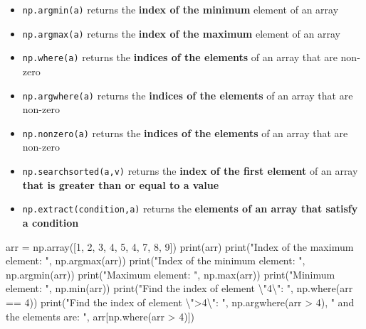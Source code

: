 \documentclass[
  letterpaper,
  DIV=11,
  numbers=noendperiod]{scrreprt}
\newenvironment{Shaded}{\begin{snugshade}}{\end{snugshade}}
\newcommand{\BuiltInTok}[1]{\textcolor[rgb]{0.00,0.23,0.31}{#1}}
\newcommand{\CharTok}[1]{\textcolor[rgb]{0.13,0.47,0.30}{#1}}
\newcommand{\DecValTok}[1]{\textcolor[rgb]{0.68,0.00,0.00}{#1}}
\newcommand{\NormalTok}[1]{\textcolor[rgb]{0.00,0.23,0.31}{#1}}
\newcommand{\OperatorTok}[1]{\textcolor[rgb]{0.37,0.37,0.37}{#1}}
\newcommand{\StringTok}[1]{\textcolor[rgb]{0.13,0.47,0.30}{#1}}
\providecommand{\tightlist}{%
  \setlength{\itemsep}{0pt}\setlength{\parskip}{0pt}}\usepackage{longtable,booktabs,array}
\begin{document}
\begin{itemize}
\tightlist
\item
  \texttt{np.argmin(a)} returns the \textbf{index of the minimum}
  element of an array
\item
  \texttt{np.argmax(a)} returns the \textbf{index of the maximum}
  element of an array
\item
  \texttt{np.where(a)} returns the \textbf{indices of the elements} of
  an array that are non-zero
\item
  \texttt{np.argwhere(a)} returns the \textbf{indices of the elements}
  of an array that are non-zero
\item
  \texttt{np.nonzero(a)} returns the \textbf{indices of the elements} of
  an array that are non-zero
\item
  \texttt{np.searchsorted(a,v)} returns the \textbf{index of the first
  element} of an array \textbf{that is greater than or equal to a value}
\item
  \texttt{np.extract(condition,a)} returns the \textbf{elements of an
  array that satisfy a condition}
\end{itemize}

\begin{Shaded}
\begin{Highlighting}[]
\NormalTok{arr }\OperatorTok{=}\NormalTok{ np.array([}\DecValTok{1}\NormalTok{, }\DecValTok{2}\NormalTok{, }\DecValTok{3}\NormalTok{, }\DecValTok{4}\NormalTok{, }\DecValTok{5}\NormalTok{, }\DecValTok{4}\NormalTok{, }\DecValTok{7}\NormalTok{, }\DecValTok{8}\NormalTok{, }\DecValTok{9}\NormalTok{])}
\BuiltInTok{print}\NormalTok{(arr)}
\BuiltInTok{print}\NormalTok{(}\StringTok{"Index of the maximum element: "}\NormalTok{, np.argmax(arr))}
\BuiltInTok{print}\NormalTok{(}\StringTok{"Index of the minimum element: "}\NormalTok{, np.argmin(arr))}
\BuiltInTok{print}\NormalTok{(}\StringTok{"Maximum element: "}\NormalTok{, np.}\BuiltInTok{max}\NormalTok{(arr))}
\BuiltInTok{print}\NormalTok{(}\StringTok{"Minimum element: "}\NormalTok{, np.}\BuiltInTok{min}\NormalTok{(arr))}
\BuiltInTok{print}\NormalTok{(}\StringTok{"Find the index of element }\CharTok{\textbackslash{}"}\StringTok{4}\CharTok{\textbackslash{}"}\StringTok{: "}\NormalTok{, np.where(arr }\OperatorTok{==} \DecValTok{4}\NormalTok{))}
\BuiltInTok{print}\NormalTok{(}\StringTok{"Find the index of element }\CharTok{\textbackslash{}"}\StringTok{\textgreater{}4}\CharTok{\textbackslash{}"}\StringTok{: "}\NormalTok{, np.argwhere(arr }\OperatorTok{\textgreater{}} \DecValTok{4}\NormalTok{),}
       \StringTok{" and the elements are: "}\NormalTok{, arr[np.where(arr }\OperatorTok{\textgreater{}} \DecValTok{4}\NormalTok{)])}
\end{Highlighting}
\end{Shaded}
\end{document}

